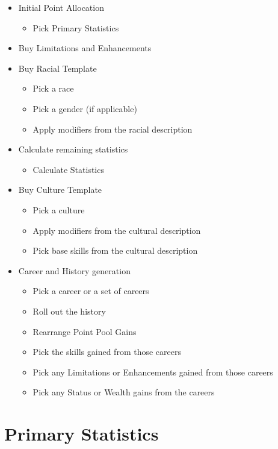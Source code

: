 \begin{itemize}
	\item Initial Point Allocation
		\begin{itemize}
			\item Pick Primary Statistics
		\end{itemize}
	\item Buy Limitations and Enhancements 
    \item Buy Racial Template
		\begin{itemize}
            \item Pick a race 
			\item Pick a gender (if applicable)
            \item Apply modifiers from the racial description
		\end{itemize}
    \item Calculate remaining statistics
		\begin{itemize}
			\item Calculate Statistics
		\end{itemize}
    \item Buy Culture Template
		\begin{itemize}
            \item Pick a culture 
            \item Apply modifiers from the cultural description
            \item Pick base skills from the cultural description
		\end{itemize}
    \item Career and History generation
		\begin{itemize}
			\item Pick a career or a set of careers
            \item Roll out the history
			\item Rearrange Point Pool Gains
			\item Pick the skills gained from those careers
            \item Pick any Limitations or Enhancements gained from those careers 
            \item Pick any Status or Wealth gains from the careers 
        \end{itemize} 
\end{itemize}

\section{Primary Statistics}

